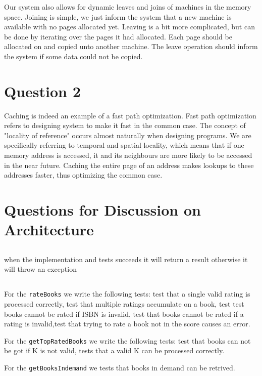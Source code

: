 \documentclass[11pt]{article}
\begin{document}
Our system also allows for dynamic leaves and joins of machines in the memory
space. Joining is simple, we just inform the system that a new machine is
available with no pages allocated yet. Leaving is a bit more complicated, but
can be done by iterating over the pages it had allocated. Each page should be
allocated on and copied unto another machine. The leave operation should inform
the system if some data could not be copied.

\section{Question 2}




Caching is indeed an example of a fast path optimization. Fast path optimization
refers to designing system to make it fast in the common case. The concept of
"locality of reference" occurs almost naturally when designing programs.
We are specifically referring to temporal and spatial locality, which means that
if one memory address is accessed, it and its neighbours are more likely to be
accessed in the near future. Caching the entire page of an address makes lookups
to these addresses faster, thus optimizing the common case.

\section{Questions for Discussion on Architecture}
\subsection{}
when the implementation and tests succeeds it will return a result otherwise it will throw an exception

\subsection{}
For the \texttt{rateBooks} we write the following tests: test that a single valid rating is processed correctly, test that multiple ratings accumulate on a book, test test books cannot be rated if ISBN is invalid, test that books cannot be rated if a rating is invalid,test that trying to rate a book not in the score causes an error.

For the \texttt{getTopRatedBooks} we write the following tests: test that books can not be got if K is not valid, tests that a valid K can be processed correctly.

For the \texttt{getBooksIndemand} we tests that books in demand can be retrived.
\end{document}
